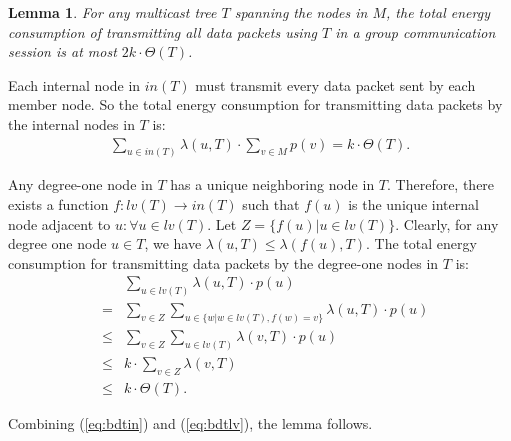 \documentclass[10pt, conference, compsocconf]{IEEEtran}
\newtheorem{lemma}{\textbf{Lemma}}
\begin{document}
  \begin{lemma}
For any multicast tree $T$ spanning the nodes in $M$, the total energy consumption of transmitting all data packets using $T$ in a group communication session is at most $2k \cdot \Theta(T)$.
    \label{lma:upbdtrans}
\end{lemma}
\begin{IEEEproof}
Each internal node in $\mathit{in}(T)$ must transmit every data packet sent by each member node. So the total energy consumption for transmitting data packets by the internal nodes in $T$ is:
\begin{eqnarray}
      \sum\nolimits_{u \in in(T)} {\lambda (u,T) \cdot \sum\nolimits_{v \in M} {p(v)} } = k\cdot \Theta(T). \label{eq:bdtin}
    \end{eqnarray}

    Any degree-one node in $T$ has a unique neighboring node in $T$. Therefore, there exists a function $f:\mathit{lv}(T)\rightarrow \mathit{in}(T)$ such that $f(u)$ is the unique internal node adjacent to $u: \forall u \in \mathit{lv}(T)$. Let $Z = \{ f(u)|u \in \mathit{lv}(T)\}$. Clearly, for any degree one node $u \in T$, we have $\lambda(u,T) \le \lambda(f(u),T)$. The total energy consumption for transmitting data packets by the degree-one nodes in $T$ is:
\begin{eqnarray}
      &&\sum\nolimits_{u \in \mathit{lv}(T)}{\lambda (u,T) \cdot p(u)} \nonumber \\
      &=& \sum\nolimits_{v \in Z} \sum\nolimits_{u \in \{w|w\in \mathit{lv}(T),f(w) = v\}} \lambda (u,T) \cdot p(u) \nonumber \\
      &\le& \sum\nolimits_{v \in Z} {\sum\nolimits_{u \in \mathit{lv}(T)} {\lambda (v,T) \cdot p(u)} } \nonumber \\
      &\le& k \cdot \sum\nolimits_{v \in Z} {\lambda (v,T)} \nonumber \\
      &\le& k \cdot \Theta (T). \label{eq:bdtlv}
    \end{eqnarray}

    Combining (\ref{eq:bdtin}) and (\ref{eq:bdtlv}), the lemma follows.
  \end{IEEEproof}
\end{document}
